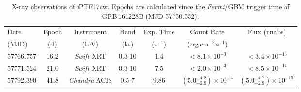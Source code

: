 \documentclass[twocolumn]{emulateapj}
\begin{document}
\begin{center}
\begin{longtable}{lcccccc}
\caption{X-ray observations of iPTF17cw. Epochs are calculated since the \textit{Fermi}/GBM trigger time of GRB\,161228B (MJD 57750.552).\label{X}}
\\
\hline
\hline
Date & Epoch & Instrument & Band & Exp. Time & Count Rate & Flux (unabs)\\
(MJD) & (d) & (keV) & (ks) & (s$^{-1}$) & (erg\,cm$^{-2}$\,s$^{-1}$)\\ 
\hline
\endhead
57766.757 & 16.2 &\textit{Swift}-XRT &  0.3-10 & 1.4 & $< 8.1 \times 10^{-3}$ & $< 3.4 \times 10^{-13}$\\
57771.524 & 21.0&\textit{Swift}-XRT & 0.3-10 & 7.5 & $< 2.0 \times 10^{-3}$ & $< 8.5 \times 10^{-14}$\\
57792.390 & 41.8&\textit{Chandra}-ACIS & 0.5-7  & 9.86  & $\left(5.0_{-2.9}^{+4.8}\right) \times10^{-4}$ & $\left(5.0_{-2.9}^{+4.7}\right) \times 10^{-15}$\\
\hline
\end{longtable}
\end{center}
\end{document}
